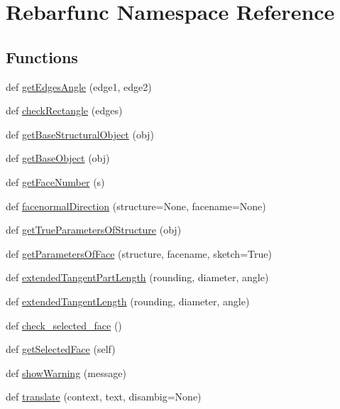 \hypertarget{namespaceRebarfunc}{}\section{Rebarfunc Namespace Reference}
\label{namespaceRebarfunc}
\subsection*{Functions}
\begin{DoxyCompactItemize}
\item 
def \hyperlink{namespaceRebarfunc_a3c75160aea4e3fd67b08c557e53a6910}{get\+Edges\+Angle} (edge1, edge2)
\item 
def \hyperlink{namespaceRebarfunc_a24ab60160ea54e86c0ce1b727621bf71}{check\+Rectangle} (edges)
\item 
def \hyperlink{namespaceRebarfunc_a20bba2119d962302eada384246cd6270}{get\+Base\+Structural\+Object} (obj)
\item 
def \hyperlink{namespaceRebarfunc_a7169bcadefe75626e6cfb7549b1deb4b}{get\+Base\+Object} (obj)
\item 
def \hyperlink{namespaceRebarfunc_a3885b3b63e3a41508ac79bc7550cf301}{get\+Face\+Number} (s)
\item 
def \hyperlink{namespaceRebarfunc_a3a8c123c290609baec3a547c20a561b9}{facenormal\+Direction} (structure=None, facename=None)
\item 
def \hyperlink{namespaceRebarfunc_a56b5187c8b2c8bf1b14b4fc88eb6d54c}{get\+True\+Parameters\+Of\+Structure} (obj)
\item 
def \hyperlink{namespaceRebarfunc_a92122b3d7cedd3d47bb63380a5ac4d08}{get\+Parameters\+Of\+Face} (structure, facename, sketch=True)
\item 
def \hyperlink{namespaceRebarfunc_aaeecb468e0fcfc5eee69d6a24c5c5aef}{extended\+Tangent\+Part\+Length} (rounding, diameter, angle)
\item 
def \hyperlink{namespaceRebarfunc_ab5637ab0a8e202409ee8657d39ca87a0}{extended\+Tangent\+Length} (rounding, diameter, angle)
\item 
def \hyperlink{namespaceRebarfunc_adae2713855a7e1b4bda04081ae671542}{check\+\_\+selected\+\_\+face} ()
\item 
def \hyperlink{namespaceRebarfunc_a8c003df49ac5f249bd9ea4acfb7d2f8d}{get\+Selected\+Face} (self)
\item 
def \hyperlink{namespaceRebarfunc_a2278a0602d46a62953af1fcf2e574a94}{show\+Warning} (message)
\item 
def \hyperlink{namespaceRebarfunc_a1467a55852e36c36c472e222855bb937}{translate} (context, text, disambig=None)
\end{DoxyCompactItemize}
